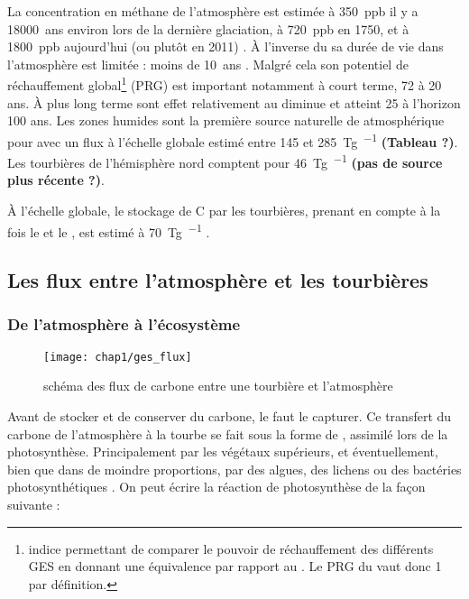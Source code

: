 La concentration en méthane de l'atmosphère est estimée à \SI{350}{ppb} il y a \SI{18000}{ans} environ lors de la dernière glaciation, à \SI{720}{ppb} en 1750, et à \SI{1800}{ppb} aujourd'hui (ou plutôt en 2011) \citep{Ciais2014}.
À l'inverse du \coo sa durée de vie dans l'atmosphère est limitée : moins de \SI{10}{ans} \citep{lelieveld1998,prather2012}.
Malgré cela son potentiel de réchauffement global\footnote{indice permettant de comparer le pouvoir de réchauffement des différents GES en donnant une équivalence par rapport au \coo. Le PRG du \coo vaut donc 1 par définition.} (PRG) est important notamment à court terme, 72 à 20 ans.
À plus long terme sont effet relativement au \coo diminue et atteint 25 à l'horizon 100 ans.
Les zones humides sont la première source naturelle de \chh atmosphérique pour avec un flux à l'échelle globale estimé entre \num{145} et \SI{285}{\tera\gram\per\year} \citep{lelieveld1998,wuebbles2002,Ciais2014} \textbf{(Tableau ?)}.
Les tourbières de l'hémisphère nord comptent pour \SI{46}{\tera\gram\per\year} \citep{gorham1991} \textbf{(pas de source plus récente ?)}.


À l'échelle globale, le stockage de C par les tourbières, prenant en compte à la fois le \coo et le \chh, est estimé à \SI{70}{\tera\gram\per\year} \citep{clymo1998}.

\subsection{Les flux entre l'atmosphère et les tourbières}

\subsubsection{De l'atmosphère à l'écosystème}

\begin{figure}
\centering
\texttt{[image: chap1/ges\_flux]}
\caption{schéma des flux de carbone entre une tourbière et l'atmosphère}
\label{fig:ges_flux}
\end{figure}

Avant de stocker et de conserver du carbone, le faut le capturer.
Ce transfert du carbone de l'atmosphère à la tourbe se fait sous la forme de \coo, assimilé lors de la photosynthèse.
Principalement par les végétaux supérieurs, et éventuellement, bien que dans de moindre proportions, par des algues, des lichens ou des bactéries photosynthétiques \cite{girard2011}.
On peut écrire la réaction de photosynthèse de la façon suivante : 

